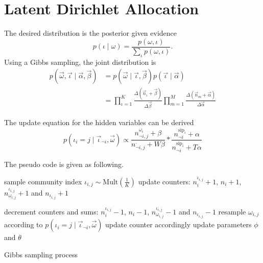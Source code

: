 \documentclass[paper=a4, fontsize=11pt]{scrartcl}
\begin{document}
\section{Latent Dirichlet Allocation}

The desired distribution is the posterior given evidence
\begin{equation}
p( \iota \mid \omega ) = \frac{ p( \omega , \iota ) }{ \sum_{ \iota } p( \omega , \iota ) }.
\end{equation}
Using a Gibbs sampling, the joint distribution is
\begin{equation}
\begin{aligned}
p( \vec{\omega}, \vec{\iota} \mid \vec{\alpha}, \vec{\beta} )  & = p( \vec{\omega} \mid \vec{\iota}, \vec{\beta} ) p( \vec{\iota} \mid \vec{\alpha} ) \\
& = \prod_{\iota = 1}^{K} \frac{\Delta(\vec{n}_{\iota}+\vec{\beta})}{\Delta{\vec{\beta}}}
\prod_{m=1}^{M} \frac{\Delta(\vec{n}_{m}+\vec{\alpha})}{\Delta{\vec{\alpha}}}
\end{aligned}
\end{equation}

The update equation for the hidden variables can be derived
\begin{equation}
p( \iota_{i} = j \mid \vec{\iota}_{\neg i}, \vec{\omega}) \propto 
\frac{ n^{\omega_{i}}_{\neg i, j}+\beta }{ n^{\cdot}_{\neg i, j}+W\beta } \ast \frac{ n^{\mbox{sip}_{i}}_{\neg i}+\alpha }{ n^{\mbox{sip}_{i}}_{\neg i}+T\alpha }
\end{equation}

The pseudo code is given as following.
\begin{algorithm}
\begin{algorithmic}[1]
\State sample community index $ \iota_{i,j} \sim \mbox{Mult}(\frac{1}{K}) $
\State update counters: $ n^{\iota_{i,j}}_{i} + 1 $, $ n_{i} + 1 $, $ n^{\iota_{i,j}}_{\omega_{i,j}} +1 $ and $ n_{\iota_{i,j}} +1 $
\EndFor
\EndFor

\State decrement counters and sums:  $ n^{\iota_{i,j}}_{i} - 1 $, $ n_{i} - 1 $, $ n^{\iota_{i,j}}_{\omega_{i,j}} - 1 $ and $ n_{\iota_{i,j}} - 1 $ 
\State resample $ \omega_{i,j} $ according to  $ p(\iota_{i}=j \mid \vec{\iota}_{\neg i}, \vec{\omega} ) $
\State update counter accordingly
\EndFor
\EndFor
{}
\State update parameters $ \phi $ and $ \theta $
\EndIf
\EndWhile
\end{algorithmic}
\caption{Gibbs sampling process}
\end{algorithm}





\end{document}
